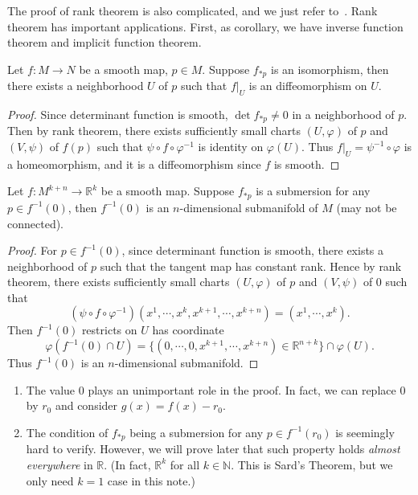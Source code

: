 The proof of rank theorem is also complicated, and we just refer to~\cite[Theorem~4.12]{LeeSM}.
Rank theorem has important applications.
First, as corollary, we have inverse function theorem and implicit function theorem.
\begin{thm}
    Let $f:M\to N$ be a smooth map, $p\in M$.
    Suppose $f_{*p}$ is an isomorphism, then there exists a neighborhood $U$ of $p$ such that $f|_U$ is an diffeomorphism on $U$.
\end{thm}
\begin{proof}
    Since determinant function is smooth, $\det{f_{*p}}\neq 0$ in a neighborhood of $p$.
    Then by rank theorem, there exists sufficiently small charts $(U,\varphi)$ of $p$ and $(V,\psi)$ of $f(p)$ such that $\psi\circ f\circ\varphi^{-1}$ is identity on $\varphi(U)$.
    Thus $f|_U=\psi^{-1}\circ\varphi$ is a homeomorphism, and it is a diffeomorphism since $f$ is smooth.
\end{proof}

\begin{thm}
    Let $f:M^{k+n}\to\mathbb{R}^k$ be a smooth map.
    Suppose $f_{*p}$ is a submersion for any $p\in f^{-1}(0)$, then $f^{-1}(0)$ is an $n$-dimensional submanifold of $M$ (may not be connected).
\end{thm}
\begin{proof}
    For $p\in f^{-1}(0)$, since determinant function is smooth, there exists a neighborhood of $p$ such that the tangent map has constant rank.
    Hence by rank theorem, there exists sufficiently small charts $(U,\varphi)$ of $p$ and $(V,\psi)$ of $0$ such that
    \[(\psi\circ f\circ\varphi^{-1})(x^1,\cdots,x^k,x^{k+1},\cdots,x^{k+n})=(x^1,\cdots,x^k).\]
    Then $f^{-1}(0)$ restricts on $U$ has coordinate
    \[\varphi(f^{-1}(0)\cap U)=\{(0,\cdots,0,x^{k+1},\cdots,x^{k+n})\in\mathbb{R}^{n+k}\}\cap\varphi(U).\]
    Thus $f^{-1}(0)$ is an $n$-dimensional submanifold.
\end{proof}
\begin{rem}
    \begin{enumerate}[(1)]
        \item The value $0$ plays an unimportant role in the proof.
        In fact, we can replace $0$ by $r_0$ and consider $g(x)=f(x)-r_0$.
        \item The condition of $f_{*p}$ being a submersion for any $p\in f^{-1}(r_0)$ is seemingly hard to verify.
        However, we will prove later that such property holds \emph{almost everywhere} in $\mathbb{R}$.
        (In fact, $\mathbb{R}^k$ for all $k\in\mathbb{N}$. This is Sard's Theorem, but we only need $k=1$ case in this note.)
    \end{enumerate}
\end{rem}

